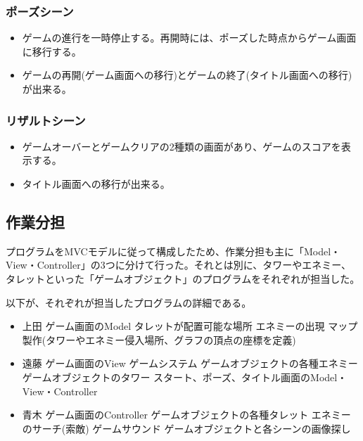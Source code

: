 \documentclass[11pt,a4j]{jarticle}
\begin{document}
\subsubsection{ポーズシーン}

\begin{itemize}
    \item
          ゲームの進行を一時停止する。再開時には、ポーズした時点からゲーム画面に移行する。
    \item
          ゲームの再開(ゲーム画面への移行)とゲームの終了(タイトル画面への移行)が出来る。
\end{itemize}

\subsubsection{リザルトシーン}

\begin{itemize}
    \item
          ゲームオーバーとゲームクリアの2種類の画面があり、ゲームのスコアを表示する。
    \item
          タイトル画面への移行が出来る。
\end{itemize}


\subsection{作業分担}

プログラムをMVCモデルに従って構成したため、作業分担も主に「Model・View・Controller」の3つに分けて行った。それとは別に、タワーやエネミー、タレットといった「ゲームオブジェクト」のプログラムをそれぞれが担当した。

以下が、それぞれが担当したプログラムの詳細である。

\begin{itemize}
    \item 上田
          \subitem ゲーム画面のModel
          \subitem タレットが配置可能な場所
          \subitem エネミーの出現
          \subitem マップ製作(タワーやエネミー侵入場所、グラフの頂点の座標を定義)

    \item 遠藤
          \subitem ゲーム画面のView
          \subitem ゲームシステム
          \subitem ゲームオブジェクトの各種エネミー
          \subitem ゲームオブジェクトのタワー
          \subitem スタート、ポーズ、タイトル画面のModel・View・Controller

    \item 青木
          \subitem ゲーム画面のController
          \subitem ゲームオブジェクトの各種タレット
          \subitem エネミーのサーチ(索敵)
          \subitem ゲームサウンド
          \subitem ゲームオブジェクトと各シーンの画像探し
\end{itemize}
\end{document}
